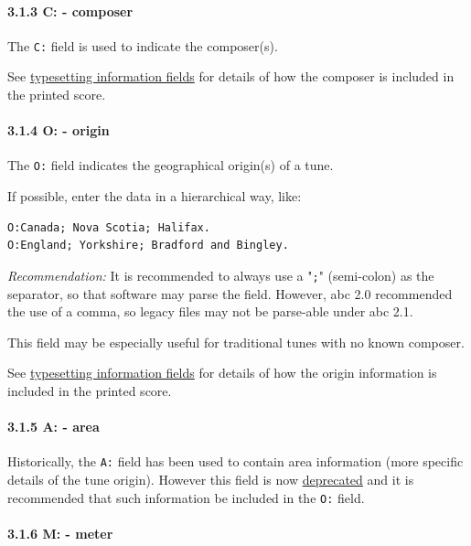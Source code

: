 \documentclass[oneside]{book}
\let\oldparagraph\paragraph
\renewcommand{\paragraph}[1]{\oldparagraph{#1}\mbox{}}
\begin{document}
\hypertarget{ccomposer}{\paragraph{3.1.3 C: -
composer}\label{ccomposer}}

The \texttt{C:} field is used to indicate the composer(s).

See \protect\hyperlink{typesetting_information_fields}{typesetting
information fields} for details of how the composer is included in the
printed score.

\hypertarget{oorigin}{\paragraph{3.1.4 O: - origin}\label{oorigin}}

The \texttt{O:} field indicates the geographical origin(s) of a tune.

If possible, enter the data in a hierarchical way, like:

\begin{verbatim}
O:Canada; Nova Scotia; Halifax.
O:England; Yorkshire; Bradford and Bingley.
\end{verbatim}

\emph{Recommendation:} It is recommended to always use a "\texttt{;}"
(semi-colon) as the separator, so that software may parse the field.
However, abc 2.0 recommended the use of a comma, so legacy files may not
be parse-able under abc 2.1.

This field may be especially useful for traditional tunes with no known
composer.

See \protect\hyperlink{typesetting_information_fields}{typesetting
information fields} for details of how the origin information is
included in the printed score.

\hypertarget{aarea}{\paragraph{3.1.5 A: - area}\label{aarea}}

Historically, the \texttt{A:} field has been used to contain area
information (more specific details of the tune origin). However this
field is now \protect\hyperlink{outdated_syntax}{deprecated} and it is
recommended that such information be included in the \texttt{O:} field.

\hypertarget{mmeter}{\paragraph{3.1.6 M: - meter}\label{mmeter}}
\end{document}
